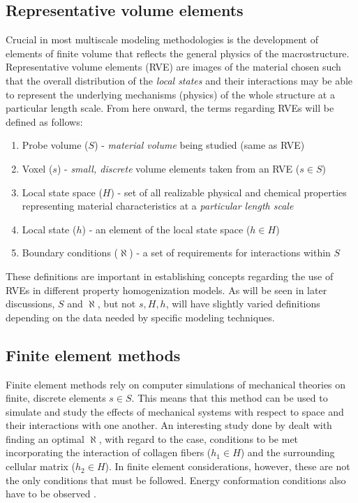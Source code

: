 \subsection{Representative volume elements}

Crucial in most multiscale modeling methodologies is the development of elements of finite volume that reflects the general physics of the macrostructure.
Representative volume elements (RVE) are images of the material chosen such that the overall distribution of the \emph{local states} and their interactions may be able to represent the underlying mechanisms (physics) of the whole structure at a particular length scale.
From here onward, the terms regarding RVEs will be defined as follows:

\begin{enumerate}
  \item Probe volume ($S$) - \emph{material volume} being studied (same as RVE)
  \item Voxel ($s$) - \emph{small, discrete} volume elements taken from an RVE ($s \in S$)
  \item Local state space ($H$) - set of all realizable physical and chemical properties representing material characteristics at a \emph{particular length scale}
  \item Local state ($h$) - an element of the local state space ($h \in H$)
  \item Boundary conditions ($\aleph$) - a set of requirements for interactions within $S$
\end{enumerate}

These definitions are important in establishing concepts regarding the use of RVEs in different property homogenization models.
As will be seen in later discussions, $S$ and $\aleph$, but not $s, H, h$, will have slightly varied definitions depending on the data needed by specific modeling techniques.

\subsection{Finite element methods}

Finite element methods rely on computer simulations of mechanical theories on finite, discrete elements $s \in S$.
This means that this method can be used to simulate and study the effects of mechanical systems with respect to space and their interactions with one another.
An interesting study done by  dealt with finding an optimal $\aleph$, with regard to the case, conditions to be met incorporating the interaction of collagen fibers ($h_1 \in H$) and the surrounding cellular matrix ($h_2 \in H$).
In finite element considerations, however, these are not the only conditions that must be followed.
Energy conformation conditions also have to be observed \cite{cosserat}.

